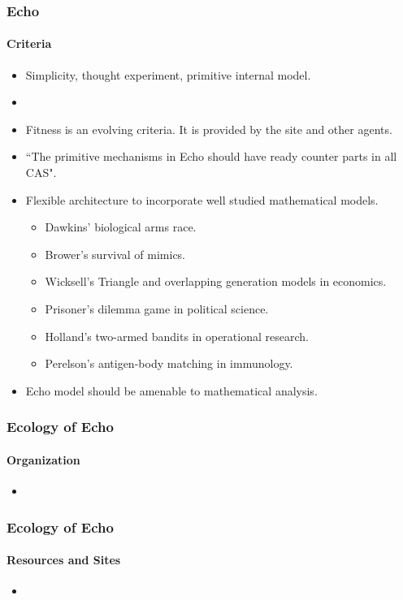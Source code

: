 \frame
{
	\frametitle{Echo}
	\framesubtitle{Criteria}

	\begin{itemize}
		\item Simplicity, thought experiment, primitive internal model.
		\item
		\item Fitness is an evolving criteria. It is provided by the site and other agents.
		\item ``The primitive mechanisms in Echo should have ready counter parts in all CAS".
		\item Flexible architecture to incorporate well studied mathematical models.
		\begin{itemize}
			\item Dawkins' biological arms race.
			\item Brower's survival of mimics.
			\item Wicksell's Triangle and overlapping generation models in economics.
			\item Prisoner's dilemma game in political science.
			\item Holland's two-armed bandits in operational research.
			\item Perelson's antigen-body matching in immunology.
		\end{itemize}
		\item Echo model should be amenable to mathematical analysis.
	\end{itemize}
}

\frame
{
	\frametitle{Ecology of Echo}
	\framesubtitle{Organization}

	\begin{itemize}
		\item 
	\end{itemize}
}

\frame
{
	\frametitle{Ecology of Echo}
	\framesubtitle{Resources and Sites}

	\begin{itemize}
		\item 
	\end{itemize}
}


